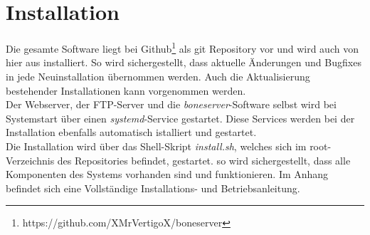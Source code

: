 \section{Installation}
Die gesamte Software liegt bei Github\footnote{https://github.com/XMrVertigoX/boneserver} als git Repository vor und wird auch von hier aus installiert. So wird sichergestellt, dass aktuelle Änderungen und Bugfixes in jede Neuinstallation übernommen werden. Auch die Aktualisierung bestehender Installationen kann vorgenommen werden.\\
Der Webserver, der FTP-Server und die \textit{boneserver}-Software selbst wird bei Systemstart über einen \textit{systemd}-Service gestartet. Diese Services werden bei der Installation ebenfalls automatisch istalliert und gestartet.\\

Die Installation wird über das Shell-Skript \textit{install.sh}, welches sich im root-Verzeichnis des Repositories befindet, gestartet. so wird sichergestellt, dass alle Komponenten des Systems vorhanden sind und funktionieren. Im Anhang befindet sich eine Vollständige Installations- und Betriebsanleitung.